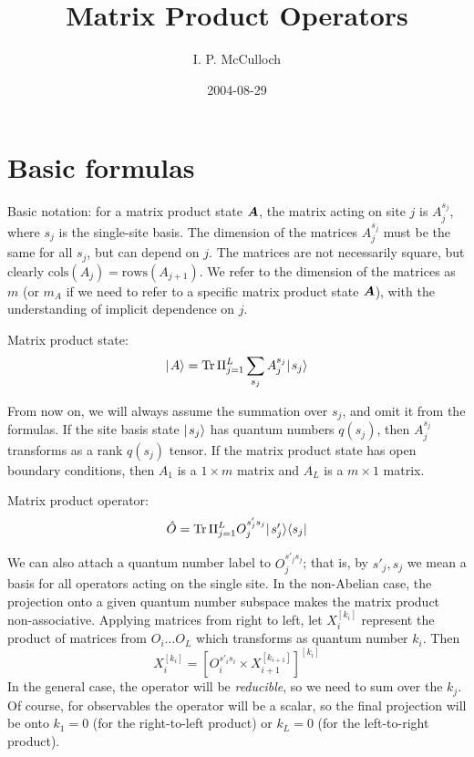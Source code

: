 \documentclass[12pt]{article}
\begin{document}
\title{Matrix Product Operators}

\author{I. P. McCulloch}
\date{2004-08-29}

\newcommand{\mps}[1]{\mbox{\boldmath $#1$}}

\maketitle

\section{Basic formulas}

Basic notation: for a matrix product state $\mps{A}$,
the matrix acting on site $j$ is $A^{s_j}_j$, where
$s_j$ is the single-site basis. The dimension of the
matrices $A^{s_j}_j$ must be the same for all $s_j$, but
can depend on $j$. The matrices are not necessarily square, but
clearly $\mbox{cols}(A_j) = \mbox{rows}(A_{j+1})$. We refer to 
the dimension of the matrices as $m$ (or $m_A$ if we need
to refer to a specific matrix product state $\mps{A}$), 
with the understanding of implicit dependence on $j$.

Matrix product state:
\[
\hbox{$\mid \! {A} \rangle$} = \mathop{\rm Tr} \Pi_{j=1}^L \sum_{s_j} A^{s_j}_j \hbox{$\mid \! {s_j} \rangle$}
\]

From now on, we will always assume the summation over $s_j$, and omit
it from the formulas. 
If the site basis state $\hbox{$\mid \! {s_j} \rangle$}$ has quantum numbers $q(s_j)$, then
$A^{s_j}_j$ transforms as a rank $q(s_j)$ tensor. 
If the matrix product state has open boundary conditions, then
$A_1$ is a $1\times m$ matrix and $A_L$ is a $m \times 1$ matrix.

Matrix product operator:
\[
\hat{O} = \mathop{\rm Tr} \Pi_{j=1}^L O^{s'_j s_j}_j \hbox{$\mid \! {s'_j} \rangle$} \langle s_j |
\]

We can also attach a quantum number label to $O^{s'_j s_j}_j$;
that is, by $s'_j,s_j$ we mean a basis for all operators acting on
the single site. In the non-Abelian case, the projection onto a
given quantum number subspace makes the matrix product non-associative.
Applying matrices from right to left, let $X^{[k_i]}_i$ represent the product
of matrices from $O_i \ldots O_L$ which transforms as quantum number $k_i$.
Then
\[
X^{[k_i]}_{i} = \left[ O^{s'_i s_i}_i \times X^{[k_{i+1}]}_{i+1}\right]^{[k_i]}
\]
In the general case, the operator will be \textit{reducible}, so we need
to sum over the $k_j$.  Of course, for observables the operator will
be a scalar, so the final projection will be onto $k_1 = 0$ (for the
right-to-left product) or $k_L=0$ (for the left-to-right product).
\end{document}
